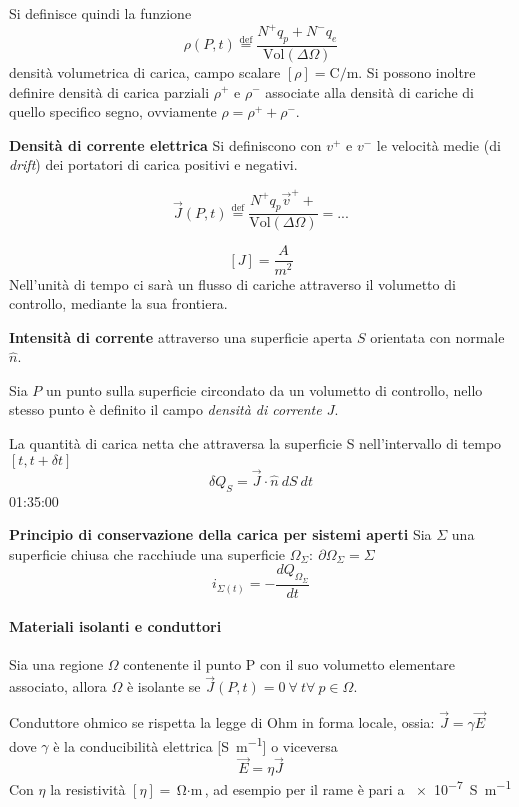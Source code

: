 Si definisce quindi la funzione 
$$
\rho(P,t) \stackrel{\text{def}}{=} \frac{N^+q_p+N^-q_e}{\text{Vol}(\Delta\Omega)}
$$
densità volumetrica di carica, campo scalare $[\rho] = \si{\coulomb\per\meter}$.
Si possono inoltre definire densità di carica parziali $\rho^+$ e $\rho^-$ associate alla densità
di cariche di quello specifico segno, ovviamente $\rho = \rho^+ + \rho^-$.

\textbf{Densità di corrente elettrica}
Si definiscono con $v^+$ e $v^-$ le velocità medie (di \textit{drift}) dei portatori di carica positivi e negativi.

$$
\vec{J}(P,t) \stackrel{\text{def}}{=} \frac{N^+q_p\vec{v}^+ + }{\text{Vol}(\Delta \Omega)} = ...
$$

$$
[J] = \frac{A}{m^2}
$$
Nell'unità di tempo ci sarà un flusso di cariche attraverso il volumetto di controllo, mediante la sua 
frontiera.

\textbf{Intensità di corrente} attraverso una superficie aperta $S$ orientata con normale $\hat{n}$.

Sia $P$ un punto sulla superficie circondato da un volumetto di controllo, nello stesso punto
è definito il campo \textit{densità di corrente $J$}.

La quantità di carica netta che attraversa la superficie S nell'intervallo di tempo $[t,t+\delta t]$
$$
\delta Q_S = \vec{J}\cdot \hat{n}\ dS\ dt
$$
01:35:00



\textbf{Principio di conservazione della carica per sistemi aperti}
Sia $\Sigma$ una superficie chiusa che racchiude una superficie
$\Omega_\Sigma:\ \partial\Omega_\Sigma=\Sigma$
$$
i_{\Sigma(t)} = - \frac{dQ_{\Omega_\Sigma}}{dt}
$$

\paragraph{Materiali isolanti e conduttori}
Sia una regione $\Omega$ contenente il punto P con il suo volumetto elementare associato, allora
$\Omega$ è isolante se $\vec{J}(P,t) = 0\ \forall\ t \forall\ p \in \Omega$.

Conduttore ohmico se rispetta la legge di Ohm in forma locale, ossia:
$\vec{J} = \gamma\vec{E}$ dove $\gamma$ è la conducibilità elettrica [\si{\siemens\per\meter}]
o viceversa
$$
\vec{E} = \eta \vec{J}
$$
Con $\eta$ la resistività $[\eta] = \si{\ohm\cdot\meter}$, ad esempio per il rame è pari a 
\SI{e-7}{\siemens\per\meter}
